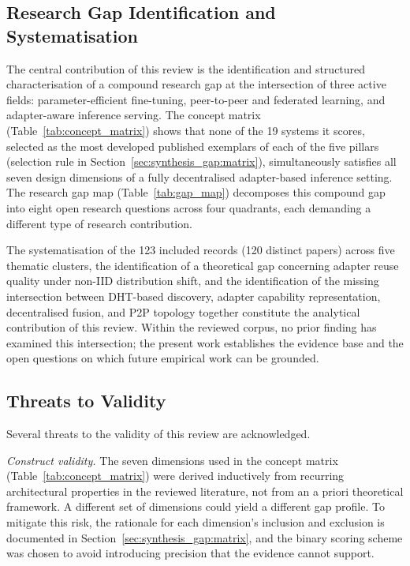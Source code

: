 \subsection{Research Gap Identification and Systematisation}
\label{sec:conclusion:contributions}

The central contribution of this review is the identification and structured
characterisation of a compound research gap at the intersection of three active
fields: parameter-efficient fine-tuning, peer-to-peer and federated learning,
and adapter-aware inference serving. The concept
matrix (Table~\ref{tab:concept_matrix}) shows that none of the 19 systems it
scores, selected as the most developed published exemplars of each of the
five pillars (selection rule in
Section~\ref{sec:synthesis_gap:matrix}), simultaneously satisfies all seven
design dimensions of a fully decentralised adapter-based inference setting. The research gap map (Table~\ref{tab:gap_map})
decomposes this compound gap into eight open research questions across four
quadrants, each demanding a different type of research contribution.

The systematisation of the 123 included records (120 distinct papers) across five thematic clusters, the identification of a theoretical gap concerning adapter reuse quality under non-IID distribution shift, and the identification of the missing
intersection between DHT-based discovery, adapter capability representation,
decentralised fusion, and P2P topology together constitute the analytical
contribution of this review.
Within the reviewed corpus, no prior finding has examined this intersection; the present work establishes the evidence base and the open
questions on which future empirical work can be grounded.

\subsection{Threats to Validity}
\label{sec:conclusion:threats}

Several threats to the validity of this review are acknowledged.

\textit{Construct validity.}
The seven dimensions used in the concept matrix (Table~\ref{tab:concept_matrix}) were derived inductively from recurring architectural properties in the reviewed literature, not from an a priori theoretical framework. A different set of dimensions could yield a different gap profile. To mitigate this risk, the rationale for each dimension's inclusion and exclusion is documented in Section~\ref{sec:synthesis_gap:matrix}, and the binary scoring scheme was chosen to avoid introducing precision that the evidence cannot support.

